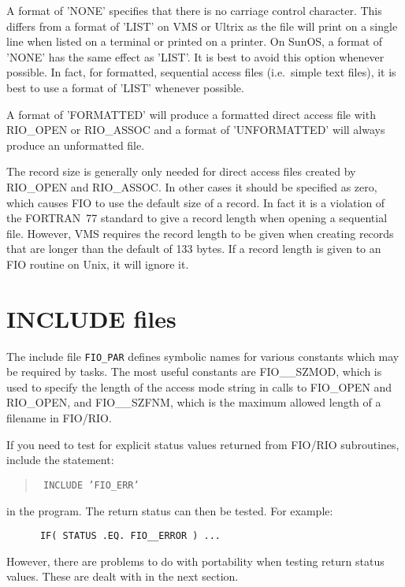 A format of 'NONE' specifies that there is no carriage control character. This
differs from a format of 'LIST' on VMS or Ultrix as the file will print on a
single line when listed on a terminal or printed on a printer. On SunOS, a
format of 'NONE' has the same effect as 'LIST'. It is best to avoid this option
whenever possible. In fact, for formatted, sequential access files (i.e.\
simple text files), it is best to use a format of 'LIST' whenever possible.

A format of 'FORMATTED' will produce a formatted direct access file with
RIO\_OPEN or RIO\_ASSOC and a format of 'UNFORMATTED' will always produce an
unformatted file.

The record size is generally only needed for direct access files created by
RIO\_OPEN and RIO\_ASSOC. In other cases it should be specified as zero, which
causes FIO to use the default size of a record. In fact it is a violation of
the FORTRAN~77 standard to give a record length when opening a sequential file.
However, VMS requires the record length to be given when creating records that
are longer than the default of 133 bytes. If a record length is given to an FIO
routine on Unix, it will ignore it.


\section{INCLUDE files}
\label{include-files}

The include file {\tt FIO\_PAR} defines symbolic names for various constants
which  may be required by tasks. The most useful constants are FIO\_\_SZMOD,
which is used to specify the length of the access mode string in calls to
FIO\_OPEN and RIO\_OPEN, and FIO\_\_SZFNM, which is the maximum allowed length
of a filename in FIO/RIO.

If you need to test for explicit status values returned from FIO/RIO
subroutines, include the statement:

\begin{quote}{\tt
      INCLUDE 'FIO\_ERR'
}
\end{quote}

in the program. The return status can then be tested. For example:

\begin{verbatim}
      IF( STATUS .EQ. FIO__ERROR ) ...
\end{verbatim}

However, there are problems to do with portability when testing return status
values. These are dealt with in the next section.

